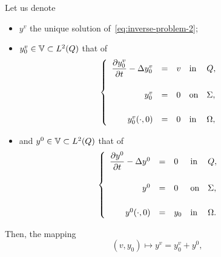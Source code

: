 \begin{remarque}%
    Let us denote
    \begin{itemize}
        \item $y^{v}$ the unique solution of~\eqref{eq:inverse-problem-2};
        \item $y_{0}^{v}\in \mathbb{V} \subset L^{2}\!\left({Q}\right)$ that of
            \begin{equation*}\label{eq:null-initial-condition}
                \begin{cases}\displaystyle
                    \begin{array}{rclll}
                        \dfrac{\partial{}y_{0}^{v}}{\partial{}t} - \Delta y_{0}^{v} & = & v &
                        \text{in} & Q,\\
                        \\
                        y_{0}^{v} & = & 0 & \text{on} & \Sigma,\\
                        \\
                        y_{0}^{v}\!\left({\cdot,0}\right) & = & 0 &
                        \text{in} & \Omega,
                    \end{array}
                \end{cases}
            \end{equation*}
        \item and $y^{0}\in \mathbb{V} \subset L^{2}\!\left({Q}\right)$ that of
            \begin{equation}\label{eq:null-source-term}
                \begin{cases}\displaystyle
                    \begin{array}{rclll}
                        \dfrac{\partial{}y^{0}}{\partial{}t} - \Delta y^{0} & = & 0 &
                        \text{in} & Q,\\
                        \\
                        y^{0} & = & 0 & \text{on} & \Sigma,\\
                        \\
                        y^{0}\!\left({\cdot,0}\right) & = & y_{0} &
                        \text{in} & \Omega.
                    \end{array}
                \end{cases}
            \end{equation}
    \end{itemize}
    Then, the mapping
    \begin{equation*}
        \left({v,y_{0}}\right)\longmapsto y^{v} = y_{0}^{v} + y^{0},

\end{equation*}
\end{remarque}

